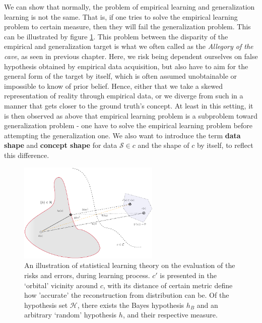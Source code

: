 We can show that normally, the problem of empirical learning and generalization learning is not the same. That is, if one tries to solve the empirical learning problem to certain measure, then they will fail the generalization problem. This can be illustrated by figure \ref{fig:genvsemp_fig}. This problem between the disparity of the empirical and generalization target is what we often called as the \textit{Allegory of the cave}, as seen in previous chapter. Here, we risk being dependent ourselves on false hypothesis obtained by empirical data acquisition, but also have to aim for the general form of the target by itself, which is often assumed unobtainable or impossible to know of prior belief. Hence, either that we take a skewed representation of reality through empirical data, or we diverge from such in a manner that gets closer to the ground truth's concept. At least in this setting, it is then observed as above that empirical learning problem is a subproblem toward generalization problem - one have to solve the empirical learning problem before attempting the generalization one. We also want to introduce the term \textbf{data shape} and \textbf{concept shape} for data $\mathcal{S}\in c$ and the shape of $c$ by itself, to reflect this difference. 

\begin{figure}[htb]
    \centering
    \includegraphics[width=0.6\textwidth]{pdf/figfig-crop.pdf}
    \caption{An illustration of statistical learning theory on the evaluation of the risks and errors, during learning process. $c'$ is presented in the `orbital' vicinity around $c$, with its distance of certain metric define how 'accurate' the reconstruction from distribution can be. Of the hypothesis set $\mathcal{H}$, there exists the Bayes hypothesis $h_{B}$ and an arbitrary `random' hypothesis $h$, and their respective measure.}
    \label{fig:genvsemp_fig}
\end{figure}

